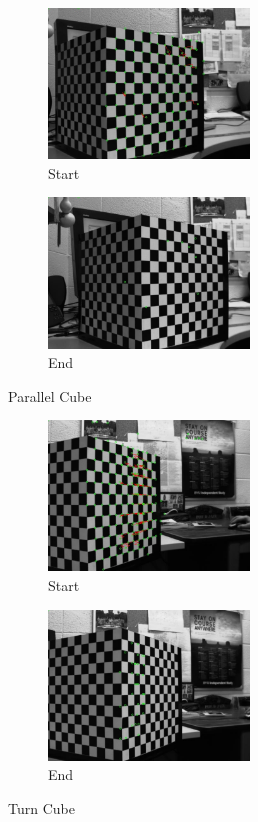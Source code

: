 \documentclass[11pt,a4paper]{report}
\begin{document}
\begin{figure}[H]
\centering
\begin{subfigure}{.5\textwidth}
  \centering
  \includegraphics[height=4cm,keepaspectratio]{outParaCubeStart}
  \caption{Start}
  \label{fig:sub1}
\end{subfigure}%
\begin{subfigure}{.5\textwidth}
  \centering
  \includegraphics[height=4cm,keepaspectratio]{outParaCubeEnd}
  \caption{End}
  \label{fig:sub2}
\end{subfigure}
\label{fig:test}
\caption{Parallel Cube}
\end{figure}

\begin{figure}[H]
\centering
\begin{subfigure}{.5\textwidth}
  \centering
  \includegraphics[height=4cm,keepaspectratio]{outTurnCubeStart}
  \caption{Start}
  \label{fig:sub1}
\end{subfigure}%
\begin{subfigure}{.5\textwidth}
  \centering
  \includegraphics[height=4cm,keepaspectratio]{outTurnCubeEnd}
  \caption{End}
  \label{fig:sub2}
\end{subfigure}
\label{fig:test}
\caption{Turn Cube}
\end{figure}
\end{document}
